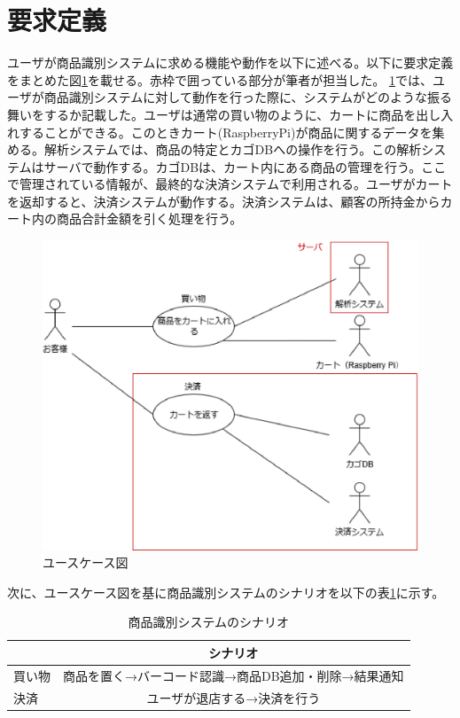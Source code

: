 \section{要求定義}
ユーザが商品識別システムに求める機能や動作を以下に述べる。以下に要求定義をまとめた図\ref{usecase}を載せる。赤枠で囲っている部分が筆者が担当した。
\ref{usecase}では、ユーザが商品識別システムに対して動作を行った際に、システムがどのような振る舞いをするか記載した。ユーザは通常の買い物のように、カートに商品を出し入れすることができる。このときカート(RaspberryPi)が商品に関するデータを集める。解析システムでは、商品の特定とカゴDBへの操作を行う。この解析システムはサーバで動作する。カゴDBは、カート内にある商品の管理を行う。ここで管理されている情報が、最終的な決済システムで利用される。ユーザがカートを返却すると、決済システムが動作する。決済システムは、顧客の所持金からカート内の商品合計金額を引く処理を行う。

\begin{figure}[htbp]
\centering
\includegraphics[width=12cm]{./pic/usecase_saishu.eps}
\caption{ユースケース図}
\label{usecase}
\end{figure}

次に、ユースケース図を基に商品識別システムのシナリオを以下の表\ref{scenario}に示す。
\begin{table}[htb]
\begin{center}
\caption{商品識別システムのシナリオ}
\begin{tabular}{|l|c|} \hline
 & シナリオ \\ \hline \hline
買い物 & 商品を置く→バーコード認識→商品DB追加・削除→結果通知 \\
決済 & ユーザが退店する→決済を行う \\ \hline
\end{tabular}
\label{scenario}
\end{center}
\end{table}

